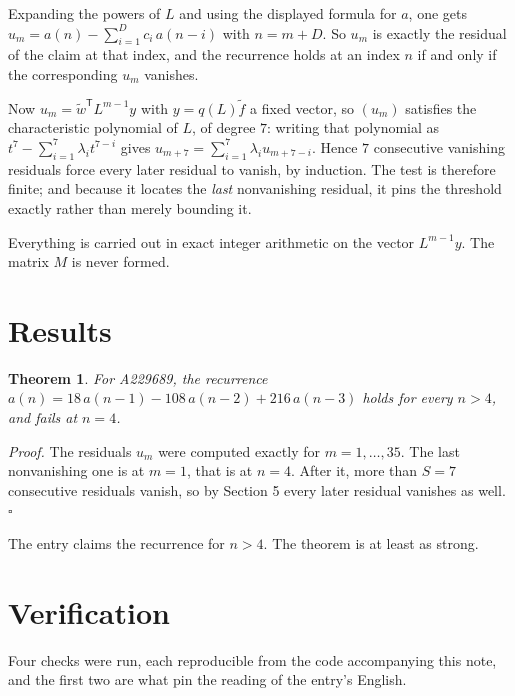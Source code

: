 \documentclass[11pt]{article}
\newtheorem{theorem}{Theorem}
\theoremstyle{definition}
\begin{document}
Expanding the powers of $L$ and using the displayed formula for $a$, one gets $u_m = a(n) - \sum_{i=1}^{D} c_i\,a(n-i)$ with $n = m + D$. So $u_m$ is exactly the residual of the claim at that index, and the recurrence holds at an index $n$ if and only if the corresponding $u_m$ vanishes.

Now $u_m = \tilde w^{\mathsf T} L^{m-1} y$ with $y = q(L)\tilde f$ a fixed vector, so $(u_m)$ satisfies the characteristic polynomial of $L$, of degree $7$: writing that polynomial as $t^{7} - \sum_{i=1}^{7} \lambda_i t^{7-i}$ gives $u_{m+7} = \sum_{i=1}^{7} \lambda_i u_{m+7-i}$. Hence $7$ consecutive vanishing residuals force every later residual to vanish, by induction. The test is therefore finite; and because it locates the {\itshape last} nonvanishing residual, it pins the threshold exactly rather than merely bounding it.

Everything is carried out in exact integer arithmetic on the vector $L^{m-1}y$. The matrix $M$ is never formed.

\section{Results}

\begin{theorem} For A229689, the recurrence $a(n) = 18\,a(n-1) - 108\,a(n-2) + 216\,a(n-3)$ holds for every $n > 4$, and fails at $n = 4$.\end{theorem}

{\itshape Proof.} The residuals $u_m$ were computed exactly for $m = 1,\dots,35$. The last nonvanishing one is at $m = 1$, that is at $n = 4$. After it, more than $S = 7$ consecutive residuals vanish, so by Section 5 every later residual vanishes as well. $\square$

The entry claims the recurrence for $n > 4$. The theorem is at least as strong.

\section{Verification}

Four checks were run, each reproducible from the code accompanying this note, and the first two are what pin the reading of the entry's English.
\end{document}
